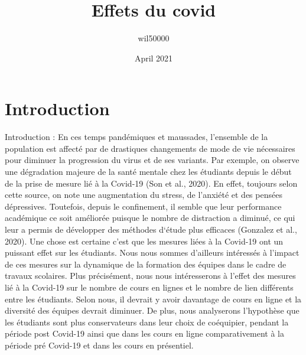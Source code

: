 \documentclass{article}
\title{Effets du covid}
\author{wil50000 }
\date{April 2021}
\begin{document}
\maketitle

\section{Introduction}
Introduction :  
En ces temps pandémiques et maussades, l’ensemble de la population est affecté par de drastiques changements de mode de vie nécessaires pour diminuer la progression du virus et de ses variants. Par exemple, on observe une dégradation majeure de la santé mentale chez les étudiants depuis le début de la prise de mesure lié à la Covid-19 (Son et al., 2020). En effet, toujours selon cette source, on note une augmentation du stress, de l’anxiété et des pensées dépressives. Toutefois, depuis le confinement, il semble que leur performance académique ce soit améliorée puisque le nombre de distraction a diminué, ce qui leur a permis de développer des méthodes d‘étude plus efficaces (Gonzalez et al., 2020). Une chose est certaine c’est que les mesures liées à la Covid-19 ont un puissant effet sur les étudiants. Nous nous sommes d’ailleurs intéressés à l’impact de ces mesures sur la dynamique de la formation des équipes dans le cadre de travaux scolaires. Plus précisément, nous nous intéresserons à l’effet des mesures lié à la Covid-19 sur le nombre de cours en lignes et le nombre de lien différents entre les étudiants. Selon nous, il devrait y avoir davantage de cours en ligne et la diversité des équipes devrait diminuer. De plus, nous analyserons l’hypothèse que les étudiants sont plus conservateurs dans leur choix de coéquipier, pendant la période post Covid-19 ainsi que dans les cours en ligne comparativement à la période pré Covid-19 et dans les cours en présentiel. 
\end{document}
